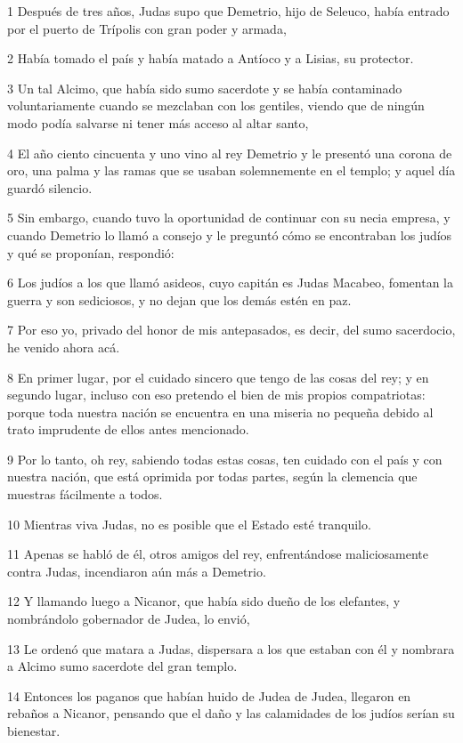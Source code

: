 \par 1 Después de tres años, Judas supo que Demetrio, hijo de Seleuco, había entrado por el puerto de Trípolis con gran poder y armada,
\par 2 Había tomado el país y había matado a Antíoco y a Lisias, su protector.
\par 3 Un tal Alcimo, que había sido sumo sacerdote y se había contaminado voluntariamente cuando se mezclaban con los gentiles, viendo que de ningún modo podía salvarse ni tener más acceso al altar santo,
\par 4 El año ciento cincuenta y uno vino al rey Demetrio y le presentó una corona de oro, una palma y las ramas que se usaban solemnemente en el templo; y aquel día guardó silencio.
\par 5 Sin embargo, cuando tuvo la oportunidad de continuar con su necia empresa, y cuando Demetrio lo llamó a consejo y le preguntó cómo se encontraban los judíos y qué se proponían, respondió:
\par 6 Los judíos a los que llamó asideos, cuyo capitán es Judas Macabeo, fomentan la guerra y son sediciosos, y no dejan que los demás estén en paz.
\par 7 Por eso yo, privado del honor de mis antepasados, es decir, del sumo sacerdocio, he venido ahora acá.
\par 8 En primer lugar, por el cuidado sincero que tengo de las cosas del rey; y en segundo lugar, incluso con eso pretendo el bien de mis propios compatriotas: porque toda nuestra nación se encuentra en una miseria no pequeña debido al trato imprudente de ellos antes mencionado.
\par 9 Por lo tanto, oh rey, sabiendo todas estas cosas, ten cuidado con el país y con nuestra nación, que está oprimida por todas partes, según la clemencia que muestras fácilmente a todos.
\par 10 Mientras viva Judas, no es posible que el Estado esté tranquilo.
\par 11 Apenas se habló de él, otros amigos del rey, enfrentándose maliciosamente contra Judas, incendiaron aún más a Demetrio.
\par 12 Y llamando luego a Nicanor, que había sido dueño de los elefantes, y nombrándolo gobernador de Judea, lo envió,
\par 13 Le ordenó que matara a Judas, dispersara a los que estaban con él y nombrara a Alcimo sumo sacerdote del gran templo.
\par 14 Entonces los paganos que habían huido de Judea de Judea, llegaron en rebaños a Nicanor, pensando que el daño y las calamidades de los judíos serían su bienestar.
